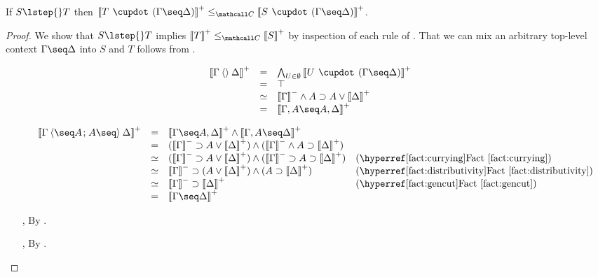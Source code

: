\begin{lemma}
  
  If $S \lstep{} T$ then $\psint{T \mix (\Gamma \seq \Delta)} \sementC \psint{S
  \mix (\Gamma \seq \Delta)}$.
\end{lemma}
\begin{proof}
  We show that $S \lstep{} T$ implies $\psint{T} \sementC \psint{S}$ by inspection
  of each rule of . That we can mix an arbitrary top-level context
  $\Gamma \seq \Delta$ into $S$ and $T$ follows from .

  \def\arraystretch{1.25}
  \begin{itemize}
    \item[\rsf{i{\da}}]
    $$
    \begin{array}{rcll}
      \psint{\Gamma \piq{} \Delta}
      &=& \bigwedge_{U \in \emptyset}{\psint{U \mix (\Gamma \seq \Delta)}} &\\
      &=& \top & \\
      &\semequiv& \nsint{\Gamma} \wedge A \limp A \lor \psint{\Delta} &\\
      &=& \psint{\Gamma, A \seq A, \Delta}
    \end{array}
    $$
    \item[\rsf{i{\ua}}]
    $$
    \begin{array}{rcll}
      \psint{\Gamma \piq{\seq A \sep A \seq} \Delta}
      &=& \psint{\Gamma \seq A, \Delta} \wedge \psint{\Gamma, A \seq \Delta} & \\
      &=& (\nsint{\Gamma} \limp A \lor \psint{\Delta}) \land (\nsint{\Gamma} \land A \limp \psint{\Delta}) & \\
      &\semequiv& (\nsint{\Gamma} \limp A \lor \psint{\Delta}) \wedge (\nsint{\Gamma} \limp A \limp \psint{\Delta}) &\text{(\reffact{currying})}\\
      &\semequiv& \nsint{\Gamma} \limp (A \lor \psint{\Delta}) \wedge (A \limp \psint{\Delta}) &\text{(\reffact{distributivity})}\\
      &\semequiv& \nsint{\Gamma} \limp \psint{\Delta} &\text{(\reffact{gencut})}\\
      &=& \psint{\Gamma \seq \Delta} & \\
    \end{array}
    $$
    \item[{\rsf{w{-}}}, {\rsf{w{+}}}] By .
    \item[{\rsf{c{-}}}, {\rsf{c{+}}}] By .


\end{itemize}
\end{proof}
